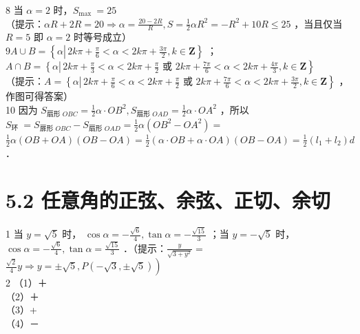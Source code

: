 \documentclass[10pt]{article}
\begin{document}
8 当 \(\alpha=2\) 时，\(S_{\text {max }}=25\)\\
（提示：\(\alpha R+2 R=20 \Rightarrow \alpha=\frac{20-2 R}{R}, S=\frac{1}{2} \alpha R^{2}=-R^{2}+10 R \leqslant 25\) ，当且仅当 \(R=5\) 即 \(\alpha=2\) 时等号成立）\\
\(9 A \cup B=\left\{\alpha \left\lvert\, 2 k \pi+\frac{\pi}{6}<\alpha<2 k \pi+\frac{3 \pi}{2}\right., k \in \mathbf{Z}\right\}\) ；\\
\(A \cap B=\left\{\alpha \left\lvert\, 2 k \pi+\frac{\pi}{3}<\alpha<2 k \pi+\frac{\pi}{2}\right.\right.\) 或 \(\left.2 k \pi+\frac{7 \pi}{6}<\alpha<2 k \pi+\frac{4 \pi}{3}, k \in \mathbf{Z}\right\}\)\\
（提示：\(A=\left\{\alpha \left\lvert\, 2 k \pi+\frac{\pi}{6}<\alpha<2 k \pi+\frac{\pi}{2}\right.\right.\) 或 \(\left.2 k \pi+\frac{7 \pi}{6}<\alpha<2 k \pi+\frac{3 \pi}{2}, k \in \mathbf{Z}\right\}\) ，作图可得答案）\\
10 因为 \(S_{\text {扇形 } O B C}=\frac{1}{2} \alpha \cdot O B^{2}, S_{\text {扇形 } O A D}=\frac{1}{2} \alpha \cdot O A^{2}\) ，所以 \(S_{\text {环 }}=S_{\text {扉形 } O B C}-S_{\text {扇形 } O A D}=\frac{1}{2} \alpha\left(O B^{2}-O A^{2}\right)=\) \(\frac{1}{2} \alpha(O B+O A)(O B-O A)=\frac{1}{2}(\alpha \cdot O B+\alpha \cdot O A)(O B-O A)=\frac{1}{2}\left(l_{1}+l_{2}\right) d\) ．

\section*{5.2 任意角的正弦、余弦、正切、余切}
1 当 \(y=\sqrt{5}\) 时， \(\cos \alpha=-\frac{\sqrt{6}}{4}, \tan \alpha=-\frac{\sqrt{15}}{3}\) ；当 \(y=-\sqrt{5}\) 时， \(\cos \alpha=-\frac{\sqrt{6}}{4}, \tan \alpha=\frac{\sqrt{15}}{3}\) ．（提示：\(\frac{y}{\sqrt{3+y^{2}}}=\) \(\left.\frac{\sqrt{2}}{4} y \Rightarrow y= \pm \sqrt{5}, P(-\sqrt{3}, \pm \sqrt{5})\right)\)\\
2 （1）＋\\
（2）＋\\
（3）+\\
（4）－
\end{document}
